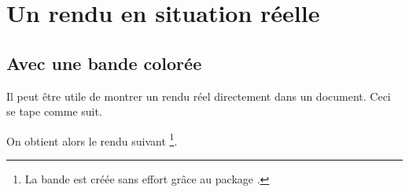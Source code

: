 

\usepackage[lang = french]{../main/main}
\usepackage{../macroenv/macroenv}
\usepackage{../listing/listing}
\usepackage{../focus/focus}


\usepackage{showcase}




\section{Un rendu en situation réelle}

\subsection{Avec une bande colorée}

\begin{bdocexa}
    Il peut être utile de montrer un rendu réel directement dans un document.
    Ceci se tape comme suit.


	On obtient alors le rendu suivant
	\footnote{
    	La bande est créée sans effort grâce au package .
	}.

	\medskip

	
\end{bdocexa}


